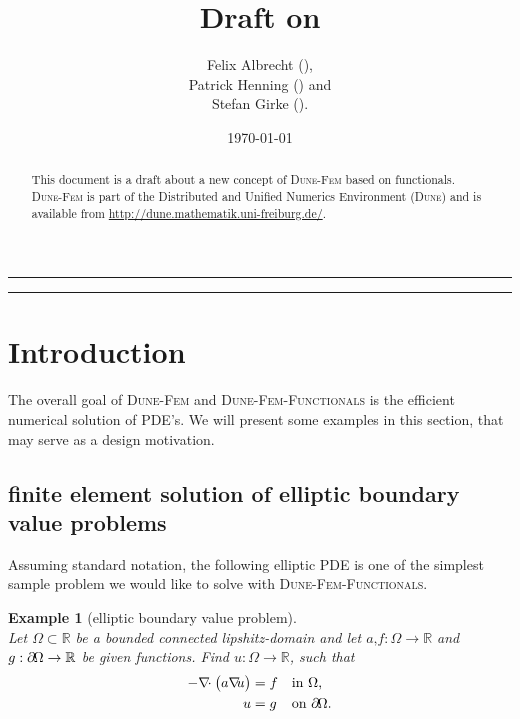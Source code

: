 \documentclass[a4paper,11pt]{article}
\title{Draft on \dunefemfunctionals}
\author{Felix Albrecht (\Code{felix.albrecht@uni-muenster.de}),\\
  Patrick Henning (\Code{patrick.henning@uni-muenster.de}) and\\
	Stefan Girke (\Code{s\_girk01@uni-muenster.de}).
}
\date{\today}
\numberwithin{equation}{section}
\newtheorem{example}[definition]{Example}
\newcommand{\theoremNewline}{\hspace{1mm}\\}
\newcommand{\theoremEndLine}{\hspace{1mm}}
\newcommand{\dune}{\textsc{Dune}\xspace}
\newcommand{\dunefem}{\textsc{Dune-Fem}\xspace}
\newcommand{\dunefemfunctionals}{\textsc{Dune-Fem-Functionals}\xspace}
\newcommand{\hnS}{\hspace{-1.25pt}}
\newcommand{\divergence}{\nabla\hnS\hnS\hnS\cdot}
\newcommand{\gradient}{\nabla\hnS\hnS}
\newcommand{\boundary}{\partial \hnS}
\newcommand{\komma}{\text{,}}
\newcommand{\punkt}{\text{.}}
\newcommand{\R}{\mathbb{R}}
\begin{document}
  \maketitle

  \begin{abstract}
    This document is a draft about a new concept of \dunefem based on functionals. \dunefem is part of the
    Distributed and Unified Numerics Environment (\dune) and is available from
    \url{http://dune.mathematik.uni-freiburg.de/}.
  \end{abstract}

  \hrule

  \begin{small}
    \tableofcontents
  \end{small}

  \vspace{5mm}
  \hrule

  \section{Introduction}
    \label{section::introduction}

    The overall goal of \dunefem and \dunefemfunctionals is the efficient numerical solution of PDE's. We will present
    some examples in this section, that may serve as a design motivation.

    \subsection{finite element solution of elliptic boundary value problems}

    Assuming standard notation, the following elliptic PDE is one of the simplest sample problem we would like to solve
    with \dunefemfunctionals.

    \begin{example}[elliptic boundary value problem]\theoremNewline
      \label{example::introduction::elliptic_pde}
      Let ${\Omega \subset \R}$ be a bounded connected lipshitz-domain and let ${a\komma f : \Omega \rightarrow \R}$ and
      ${g : \boundary\Omega \rightarrow \R}$ be given functions. Find ${u: \Omega \rightarrow \R}$, such that
      \begin{align}
        \label{equation::introduction::elliptic_pde}
        - \divergence
          \big(
            a \gradient u
          \big)
          &= f &&\text{in } \Omega \komma
        \\
        u &= g &&\text{on } \boundary\Omega \punkt
        \notag
      \end{align}
    \end{example}\theoremEndLine
\end{document}
